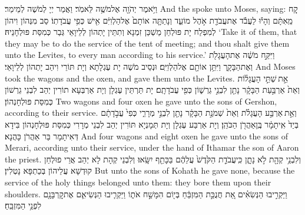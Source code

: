 {וַיֹּ֥אמֶר יְהֹוָ֖ה אֶל\maqqaf מֹשֶׁ֥ה לֵּאמֹֽר׃}
{וַאֲמַר יְיָ לְמֹשֶׁה לְמֵימַר׃}
{And the \lord\space spoke unto Moses, saying:}{}
{קַ֚ח מֵֽאִתָּ֔ם וְהָי֕וּ לַעֲבֹ֕ד אֶת\maqqaf עֲבֹדַ֖ת אֹ֣הֶל מוֹעֵ֑ד וְנָתַתָּ֤ה אוֹתָם֙ אֶל\maqqaf הַלְוִיִּ֔ם אִ֖ישׁ כְּפִ֥י עֲבֹדָתֽוֹ׃}
{סַב מִנְּהוֹן וִיהוֹן לְמִפְלַח יָת פּוּלְחַן מַשְׁכַּן זִמְנָא וְתִתֵּין יָתְהוֹן לְלֵיוָאֵי גְּבַר כְּמִסַּת פּוּלְחָנֵיהּ׃}
{‘Take it of them, that they may be to do the service of the tent of meeting; and thou shalt give them unto the Levites, to every man according to his service.’}{}
{וַיִּקַּ֣ח מֹשֶׁ֔ה אֶת\maqqaf הָעֲגָלֹ֖ת וְאֶת\maqqaf הַבָּקָ֑ר וַיִּתֵּ֥ן אוֹתָ֖ם אֶל\maqqaf הַלְוִיִּֽם׃}
{וּנְסֵיב מֹשֶׁה יָת עֶגְלָתָא וְיָת תּוֹרֵי וִיהַב יָתְהוֹן לְלֵיוָאֵי׃}
{And Moses took the wagons and the oxen, and gave them unto the Levites.}{}
{אֵ֣ת \legarmeh  שְׁתֵּ֣י הָעֲגָל֗וֹת וְאֵת֙ אַרְבַּ֣עַת הַבָּקָ֔ר נָתַ֖ן לִבְנֵ֣י גֵרְשׁ֑וֹן כְּפִ֖י עֲבֹדָתָֽם׃}
{יָת תַּרְתֵּין עֶגְלָן וְיָת אַרְבְּעָא תוֹרִין יְהַב לִבְנֵי גֵרְשׁוֹן כְּמִסַּת פּוּלְחָנְהוֹן׃}
{Two wagons and four oxen he gave unto the sons of Gershon, according to their service.}{}
{וְאֵ֣ת \legarmeh  אַרְבַּ֣ע הָעֲגָלֹ֗ת וְאֵת֙ שְׁמֹנַ֣ת הַבָּקָ֔ר נָתַ֖ן לִבְנֵ֣י מְרָרִ֑י כְּפִי֙ עֲבֹ֣דָתָ֔ם בְּיַד֙ אִֽיתָמָ֔ר בֶּֽן\maqqaf אַהֲרֹ֖ן הַכֹּהֵֽן׃}
{וְיָת אַרְבַּע עֶגְלָן וְיָת תְּמָנְיָא תּוֹרִין יְהַב לִבְנֵי מְרָרִי כְּמִסַּת פּוּלְחָנְהוֹן בִּידָא דְּאִיתָמָר בַּר אַהֲרֹן כָּהֲנָא׃}
{And four wagons and eight oxen he gave unto the sons of Merari, according unto their service, under the hand of Ithamar the son of Aaron the priest.}{}
{וְלִבְנֵ֥י קְהָ֖ת לֹ֣א נָתָ֑ן כִּֽי\maqqaf עֲבֹדַ֤ת הַקֹּ֙דֶשׁ֙ עֲלֵהֶ֔ם בַּכָּתֵ֖ף יִשָּֽׂאוּ׃}
{וְלִבְנֵי קְהָת לָא יְהַב אֲרֵי פוּלְחַן קוּדְשָׁא עֲלֵיהוֹן בְּכַתְפָּא נָטְלִין׃}
{But unto the sons of Kohath he gave none, because the service of the holy things belonged unto them: they bore them upon their shoulders.}{}
{וַיַּקְרִ֣יבוּ הַנְּשִׂאִ֗ים אֵ֚ת חֲנֻכַּ֣ת הַמִּזְבֵּ֔חַ בְּי֖וֹם הִמָּשַׁ֣ח אֹת֑וֹ וַיַּקְרִ֧יבוּ הַנְּשִׂיאִ֛ם אֶת\maqqaf קׇרְבָּנָ֖ם לִפְנֵ֥י הַמִּזְבֵּֽחַ׃}

